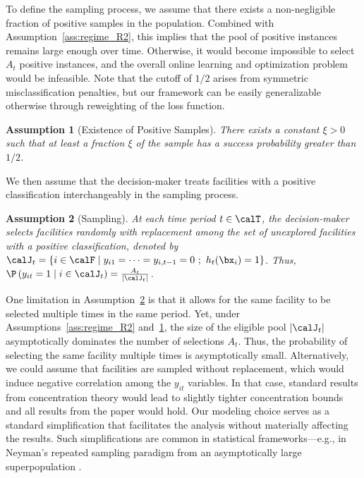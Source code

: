 \documentclass[11pt]{article}
\newtheorem{assumption}{Assumption}[]
\begin{document}
To define the sampling process, we assume that there exists a non-negligible fraction of positive samples in the population. Combined with Assumption~\ref{ass:regime_R2}, this implies that the pool of positive instances remains large enough over time. Otherwise, it would become impossible to select $A_t$ positive instances, and the overall online learning and optimization problem would be infeasible. Note that the cutoff of $1/2$ arises from symmetric misclassification penalties, but our framework can be easily generalizable otherwise through reweighting of the loss function.
\begin{assumption}[Existence of Positive Samples]\label{ass:positive_R2} There exists a constant $\xi > 0$ such that at least a fraction $\xi$ of the sample has a success probability greater than $1/2$.
\end{assumption}

We then assume that the decision-maker treats facilities with a positive classification interchangeably in the sampling process.

\begin{assumption}[Sampling]\label{ass:sampling_R2}
    At each time period $t\in\calT$, the decision-maker selects facilities randomly with replacement among the set of unexplored facilities with a positive classification, denoted by $\calJ_t=\{i\in\calF\mid y_{i1}=\cdots=y_{i,t-1}=0\ ;\ h_t(\bx_{i})=1\}$. Thus, $\P\left(y_{it}=1 \mid i \in \calJ_t\right)= 
    \frac{A_t}{|\calJ_t|}$.
\end{assumption}

One limitation in Assumption~\ref{ass:sampling_R2} is that it allows for the same facility to be selected multiple times in the same period. Yet, under Assumptions~\ref{ass:regime_R2} and~\ref{ass:positive_R2}, the size of the eligible pool $|\calJ_t|$ asymptotically dominates the number of selections $A_t$. Thus, the probability of selecting the same facility multiple times is asymptotically small. Alternatively, we could assume that facilities are sampled without replacement, which would induce negative correlation among the $y_{it}$ variables. In that case, standard results from concentration theory \citep{serfling1974probability} would lead to slightly tighter concentration bounds and all results from the paper would hold. Our modeling choice serves as a standard simplification that facilitates the analysis without materially affecting the results. Such simplifications are common in statistical frameworks—e.g., in Neyman's repeated sampling paradigm from an asymptotically large superpopulation \citep{Neyman1934,SarndalSwenssonWretman1992}.
\end{document}
